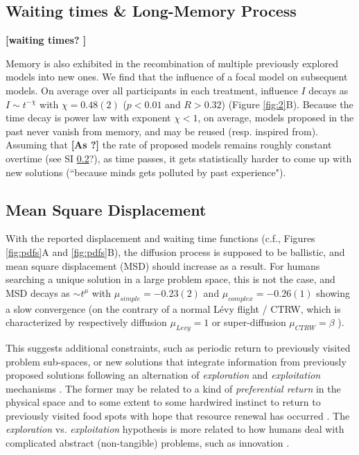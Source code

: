 \subsection{Waiting times \& Long-Memory Process}

{\bf [waiting times? ]}

Memory is also exhibited in the recombination of multiple previously explored models into new ones. We find that the influence of a focal model on subsequent models. On average over all participants in each treatment, influence $I$ decays as $I \sim t^{-\chi}$ with $\chi = 0.48(2)$ ($p < 0.01$ and $R > 0.32$)  (Figure \ref{fig:2}B). Because the time decay is power law with exponent $\chi < 1$, on average, models proposed in the past never vanish from memory, and may be reused (resp. inspired from). Assuming that {\bf [As ?]} the rate of proposed models remains roughly constant  overtime (see SI \ref{}?), as time passes, it gets statistically harder to come up with new solutions (``because minds gets polluted by past experience"). 

\subsection{Mean Square Displacement}
With the reported displacement and waiting time functions (c.f., Figures \ref{fig:pdfs}A and \ref{fig:pdfs}B), the diffusion process is supposed to be ballistic, and mean square displacement (MSD) should increase as a result. For humans searching a unique solution in a large problem space, this is not the case, and MSD decays as $\sim t^{\mu}$ with $\mu_{simple} =-0.23(2)$ and $\mu_{complex} =- 0.26(1)$ showing a slow convergence (on the contrary of a normal L\'evy flight / CTRW, which is characterized by respectively diffusion $\mu_{Levy} = 1$ or super-diffusion $\mu_{CTRW} = \beta$ \cite{21,23}). 

This suggests additional constraints, such as periodic return to previously visited problem sub-spaces, or new solutions that integrate information from previously proposed solutions following an alternation of {\it exploration} and {\it exploitation} mechanisms \cite{march1991exploration}. The former may be related to a kind of {\it preferential return} in the physical space \cite{song2010modelling} and to some extent to some hardwired instinct to return to previously visited food spots with hope that resource renewal has occurred \cite{}. The {\it exploration} vs. {\it exploitation} hypothesis is more related to how humans deal with complicated abstract (non-tangible) problems, such as innovation \cite{march1991exploration}.

